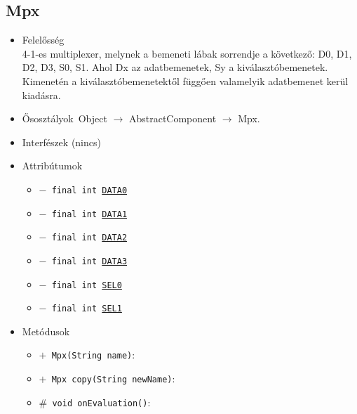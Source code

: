 \subsection{Mpx}
\begin{itemize}
\item Felelősség\\
4-1-es multiplexer, melynek a bemeneti lábak sorrendje a következő:  D0, D1, D2, D3, S0, S1. Ahol Dx az adatbemenetek, Sy a kiválasztóbemenetek.  Kimenetén a kiválasztóbemenetektől függően valamelyik adatbemenet kerül kiadásra.
\item Ősosztályok\ Object $\rightarrow{}$ AbstractComponent $\rightarrow{}$ Mpx.
\item Interfészek (nincs)
\item Attribútumok $\ $
\begin{itemize}
	\item[] \texttt{$-$ final int \underline{DATA0}} 
	\item[] \texttt{$-$ final int \underline{DATA1}} 
	\item[] \texttt{$-$ final int \underline{DATA2}} 
	\item[] \texttt{$-$ final int \underline{DATA3}} 
	\item[] \texttt{$-$ final int \underline{SEL0}} 
	\item[] \texttt{$-$ final int \underline{SEL1}} 
\end{itemize}
\item Metódusok$\ $
\begin{itemize}
	\item[] \texttt{$+$ Mpx(String name)}: 
	\item[] \texttt{$+$ Mpx copy(String newName)}: 
	\item[] \texttt{$\#$ void onEvaluation()}: 
\end{itemize}
\end{itemize}

